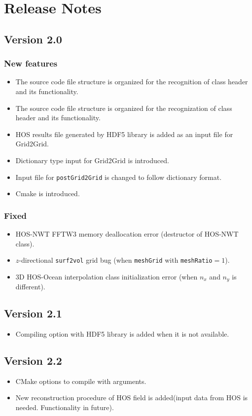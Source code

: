 \pagebreak

\pagebreak
\section*{Release Notes}

\subsection*{Version 2.0}

\subsubsection*{New features}
\begin{itemize}	
	\item The source code file structure is organized for the recognition of class header and its functionality. 
	\item The source code file structure is organized for the recognization of class header and its functionality. 
	\item HOS results file generated by HDF5 library is added as an input file for Grid2Grid. 
	\item Dictionary type input for Grid2Grid is introduced. 
	\item Input file for \texttt{postGrid2Grid} is changed to follow dictionary format. 
	\item Cmake is introduced. 
\end{itemize}

\subsubsection*{Fixed}
\begin{itemize}	
	\item HOS-NWT FFTW3 memory deallocation error (destructor of HOS-NWT class). 
	\item $z$-directional \texttt{surf2vol} grid bug (when \texttt{meshGrid} with \texttt{meshRatio}$=1$).
	\item 3D HOS-Ocean interpolation class initialization error (when $n_x$ and $n_y$ is different).
\end{itemize}

\subsection*{Version 2.1}
\begin{itemize}	
	\item Compiling option with HDF5 library is added when it is not available. 
\end{itemize}

\subsection*{Version 2.2}
\begin{itemize}	
	\item CMake options to compile with arguments.
	\item New reconstruction procedure of HOS field is added(input data from HOS is needed. Functionality in future).
\end{itemize}

\pagebreak

